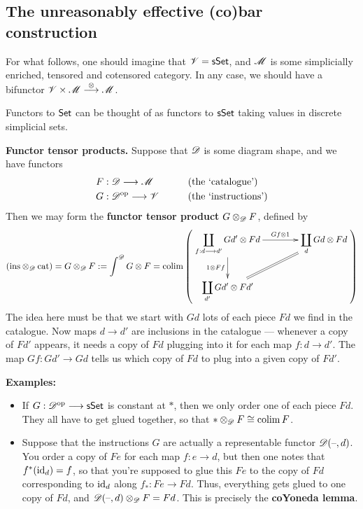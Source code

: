 \documentclass[11pt]{article}
\begin{document}
\begin{5. The unreasonably effective (co)bar construction}
\section*{The unreasonably effective (co)bar construction}
\begin{itemise}
\setlength{\parindent}{.25in}
\item For what follows, one should imagine that $\mathscr{V}=\operatorname{{\mathsf{sSet}}}$, and $\mathscr{M}$ is some simplicially enriched, tensored and cotensored category. In any case, we should have a bifunctor $\mathscr{V}\times \mathscr{M}\overset{\otimes }{\longrightarrow}\mathscr{M}$.
\item Functors to $\operatorname{{\mathsf{Set}}}$ can be thought of as functors to $\operatorname{{\mathsf{sSet}}}$ taking values in discrete simplicial sets.
\item \textbf{Functor tensor products.} Suppose that $\mathscr{D}$ is some diagram shape, and we have functors
\begin{alignat*}{2}
F
&:
\scrD\to\scrM%
&\qquad&\text{(the `catalogue')}\\
G
&:
\scrD^{\op}\to\scrV%
&\qquad&\text{(the `instructions')}
\end{alignat*}
Then we may form the \textbf{functor tensor product} ${G}\otimes_{\mathscr{D}}{F}$, defined by
\[\left(\textup{ins}\otimes _\scrd\textup{cat}\right)={G}\otimes_{\scrD}{F}:=\int^{\scrD}G\otimes F=\colim\left(\vcenter{\xymatrix@C=1.4cm{
\displaystyle\coprod_{f:d\to d'}Gd'\otimes Fd
\ar[r]^-{Gf\otimes 1}
\ar[d]_-{1\otimes Ff}
&%
\displaystyle\coprod_{d}Gd\otimes Fd
\\%
\displaystyle\coprod_{d'}Gd'\otimes Fd'
\ar@{=}[ur]
&%
}}\right)\]
The idea here must be that we start with $Gd$ lots of each piece $Fd$ we find in the catalogue. Now maps $d\to d'$ are inclusions in the catalogue --- whenever a copy of $Fd'$ appears, it needs a copy of $Fd$ plugging into it for each map $f:d\to d'$. The map $Gf:Gd'\to Gd$ tells us which copy of $Fd$ to plug into a given copy of $Fd'$.
\item \textbf{Examples:}
\begin{itemize}\squishlist
\setlength{\parindent}{.25in}
\item If $G:\mathscr{D}^{\textup{op}}\longrightarrow\operatorname{{\mathsf{sSet}}}$ is constant at $*$, then we only order one of each piece $Fd$. They all have to get glued together, so that $*\otimes _{\mathscr{D}} F\cong\operatorname*{colim} F$.
\item Suppose that the instructions $G$ are actually a representable functor $\mathscr{D}(\textup{--} ,d)$. You order a copy of $Fe$ for each map $f:e\to d$, but then one notes that $f^*(\textup{id}_d)=f$, so that you're supposed to glue this $Fe$ to the copy of $Fd$ corresponding to $\textup{id}_d$ along $f_*:Fe\to Fd$. Thus, everything gets glued to one copy of $Fd$, and $\mathscr{D}(\textup{--} ,d)\otimes_{\mathscr{D}} F=Fd$. This is precisely the \textbf{coYoneda lemma}.

\end{itemize}
\end{itemise}
\end{5. The unreasonably effective (co)bar construction}
\end{document}
